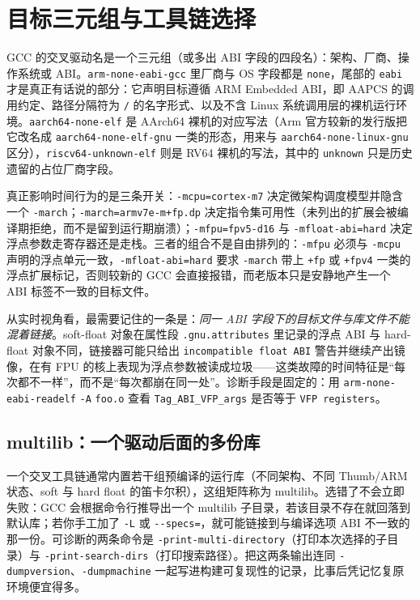 \documentclass[12pt,a4paper,fontset=fandol]{ctexbook}
\newcommand{\Tp}[1]{\texttt{#1}}
\newcommand{\Opt}[1]{\texttt{-\/-#1}}
\begin{document}
\section{目标三元组与工具链选择}

\label{sec:ch01-triplet}

GCC 的交叉驱动名是一个三元组（或多出 ABI 字段的四段名）：架构、厂商、操作系统或 ABI。\Tp{arm-none-eabi-gcc} 里厂商与 OS 字段都是 \Tp{none}，尾部的 \Tp{eabi} 才是真正有话说的部分：它声明目标遵循 ARM Embedded ABI，即 AAPCS 的调用约定、路径分隔符为 \Tp{/} 的名字形式、以及不含 Linux 系统调用层的裸机运行环境。\Tp{aarch64-none-elf} 是 AArch64 裸机的对应写法（Arm 官方较新的发行版把它改名成 \Tp{aarch64-none-elf-gnu} 一类的形态，用来与 \Tp{aarch64-none-linux-gnu} 区分），\Tp{riscv64-unknown-elf} 则是 RV64 裸机的写法，其中的 \Tp{unknown} 只是历史遗留的占位厂商字段。

真正影响时间行为的是三条开关：\Tp{-mcpu=cortex-m7} 决定微架构调度模型并隐含一个 \Tp{-march}；\Tp{-march=armv7e-m+fp.dp} 决定指令集可用性（未列出的扩展会被编译期拒绝，而不是留到运行期崩溃）；\Tp{-mfpu=fpv5-d16} 与 \Tp{-mfloat-abi=hard} 决定浮点参数走寄存器还是走栈。三者的组合不是自由排列的：\Tp{-mfpu} 必须与 \Tp{-mcpu} 声明的浮点单元一致，\Tp{-mfloat-abi=hard} 要求 \Tp{-march} 带上 \Tp{+fp} 或 \Tp{+fpv4} 一类的浮点扩展标记，否则较新的 GCC 会直接报错，而老版本只是安静地产生一个 ABI 标签不一致的目标文件。

从实时视角看，最需要记住的一条是：\emph{同一 ABI 字段下的目标文件与库文件不能混着链接}。soft-float 对象在属性段 \Tp{.gnu.attributes} 里记录的浮点 ABI 与 hard-float 对象不同，链接器可能只给出 \Tp{incompatible float ABI} 警告并继续产出镜像，在有 FPU 的核上表现为浮点参数被读成垃圾——这类故障的时间特征是``每次都不一样''，而不是``每次都崩在同一处''。诊断手段是固定的：用 \Tp{arm-none-eabi-readelf} \Tp{-A} \Tp{foo.o} 查看 \Tp{Tag\_ABI\_VFP\_args} 是否等于 \Tp{VFP registers}。

\subsection{multilib：一个驱动后面的多份库}

一个交叉工具链通常内置若干组预编译的运行库（不同架构、不同 Thumb/ARM 状态、soft 与 hard float 的笛卡尔积），这组矩阵称为 multilib。选错了不会立即失败：GCC 会根据命令行推导出一个 multilib 子目录，若该目录不存在就回落到默认库；若你手工加了 \Tp{-L} 或 \Opt{specs=}，就可能链接到与编译选项 ABI 不一致的那一份。可诊断的两条命令是 \Tp{-print-multi-directory}（打印本次选择的子目录）与 \Tp{-print-search-dirs}（打印搜索路径）。把这两条输出连同 \Tp{-dumpversion}、\Tp{-dumpmachine} 一起写进构建可复现性的记录，比事后凭记忆复原环境便宜得多。
\end{document}
